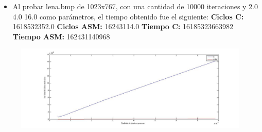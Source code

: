 \documentclass[10pt, a4paper]{article}
\begin{document}
\begin{itemize}
\begin{itemize}
\item{Al probar lena.bmp de 1023x767, con una cantidad de 10000 iteraciones y 2.0 4.0 16.0 como parámetros, el tiempo obtenido fue el siguiente:\newline
\newline
\textbf{Ciclos C:}                  1618532352.0\newline
\vspace{0.15cm}
\textbf{Ciclos ASM:}               16243114.0\newline
\textbf{Tiempo C:}                 16185323663982\newline
\textbf{Tiempo ASM:}               162431140968\newline}

\end{itemize}

\begin{figure}[H] %
\begin{center}
\includegraphics[width=560pt]{./ciclosWaves.jpg}
\end{center}
\end{figure}


\end{itemize}
\end{document}
